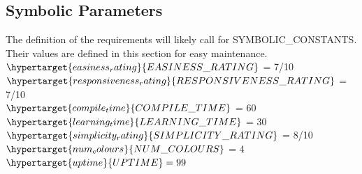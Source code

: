 \documentclass[12pt, titlepage]{article}
\begin{document}
	\subsection{Symbolic Parameters}
	
	The definition of the requirements will likely call for SYMBOLIC\_CONSTANTS.
	Their values are defined in this section for easy maintenance.\\
	
	\noindent $\hypertarget{easiness_rating}{EASINESS\_RATING}$ = 7/10 \\
	$\hypertarget{responsiveness_rating}{RESPONSIVENESS\_RATING}$ = 7/10 \\
	$\hypertarget{compile_time}{COMPILE\_TIME}$ = 60 \\
	$\hypertarget{learning_time}{LEARNING\_TIME}$  = 30\\
	$\hypertarget{simplicity_rating}{SIMPLICITY\_RATING}$ = 8/10\\
	$\hypertarget{num_colours}{NUM\_COLOURS}$ = 4\\
	$\hypertarget{uptime}{UPTIME} = 99$\\
	
	
\end{document}
